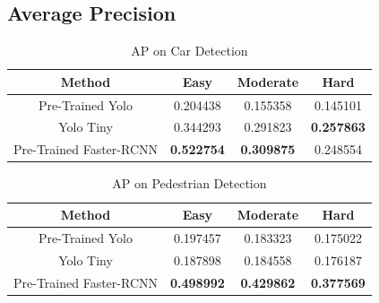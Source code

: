 \subsection{Average Precision}
\begin{table}[h!]
\centering
\begin{tabular}{ c | c | c | c }
\hline
Method & Easy & Moderate & Hard \\
\hline \hline
Pre-Trained Yolo & 0.204438 & 0.155358 & 0.145101 \\
Yolo Tiny & 0.344293 & 0.291823 & \bfseries 0.257863 \\
Pre-Trained Faster-RCNN & \bfseries 0.522754 & \bfseries 0.309875 & 0.248554 \\
\hline
\end{tabular}
\caption{AP on Car Detection}
\end{table}

\begin{table}[h!]
\centering
\begin{tabular}{ c | c | c | c }
\hline
Method & Easy & Moderate & Hard \\
\hline \hline
Pre-Trained Yolo & 0.197457 & 0.183323 & 0.175022 \\
Yolo Tiny & 0.187898 & 0.184558 & 0.176187 \\
Pre-Trained Faster-RCNN & \bfseries 0.498992 & \bfseries 0.429862 & \bfseries 0.377569 \\
\hline
\end{tabular}
\caption{AP on Pedestrian Detection}
\end{table}